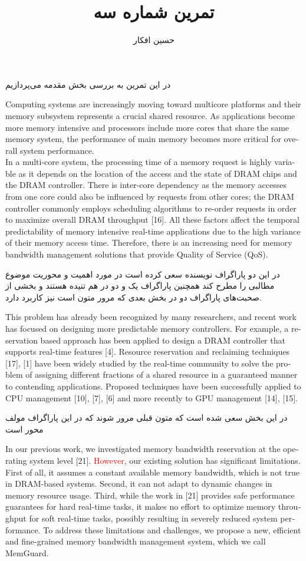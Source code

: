 \documentclass[a4paper, 11pt]{article}
\title{
    تمرین شماره سه
}
\author{حسین افکار}
\begin{document}
\maketitle

در این تمرین به بررسی بخش مقدمه می‌پردازیم \\
\begin{latin}
Computing systems are increasingly moving toward multicore
platforms and their memory subsystem represents a
crucial shared resource. As applications become more memory
intensive and processors include more cores that share the
same memory system, the performance of main memory
becomes more critical for overall system performance. \\
In a multi-core system, the processing time of a memory
request is highly variable as it depends on the location of the
access and the state of DRAM chips and the DRAM controller.
There is inter-core dependency as the memory accesses from
one core could also be influenced by requests from other
cores; the DRAM controller commonly employs scheduling
algorithms to re-order requests in order to maximize overall
DRAM throughput [16]. All these factors affect the temporal
predictability of memory intensive real-time applications due
to the high variance of their memory access time. Therefore,
there is an increasing need for memory bandwidth management solutions that
provide Quality of Service (QoS).
\end{latin}
در این دو پاراگراف نویسنده سعی کرده است در مورد اهمیت و محوریت موضوع مطالبی را مطرح کند
همچنین پاراگراف یک و دو در هم تنیده هستند و بخشی از صحبت‌های پاراگراف دو در بخش بعدی که
مرور متون است نیز کاربرد دارد.
\begin{latin}
This problem has already been recognized by many researchers,
and recent work has focused on designing more
predictable memory controllers. For example, a reservation
based approach has been applied to design a DRAM controller
that supports real-time features [4]. Resource reservation and
reclaiming techniques [17], [1] have been widely studied by
the real-time community to solve the problem of assigning
different fractions of a shared resource in a guaranteed manner
to contending applications. Proposed techniques have been
successfully applied to CPU management [10], [7], [6] and
more recently to GPU management [14], [15].
\end{latin}
در این بخش سعی شده است که متون قبلی مرور شوند که در این پاراگراف مولف محور است
\begin{latin}
In our previous work, we investigated memory bandwidth
reservation at the operating system level [21]. \textcolor{red}{However}, our
existing solution has significant limitations. First of all, it
assumes a constant available memory bandwidth, which is
not true in DRAM-based systems. Second, it can not adapt
to dynamic changes in memory resource usage. Third, while
the work in [21] provides safe performance guarantees for
hard real-time tasks, it makes no effort to optimize memory
throughput for soft real-time tasks, possibly resulting
in severely reduced system performance. To address these
limitations and challenges, we propose a new, efficient and
fine-grained memory bandwidth management system, which
we call MemGuard.
\end{latin}
\end{document}
